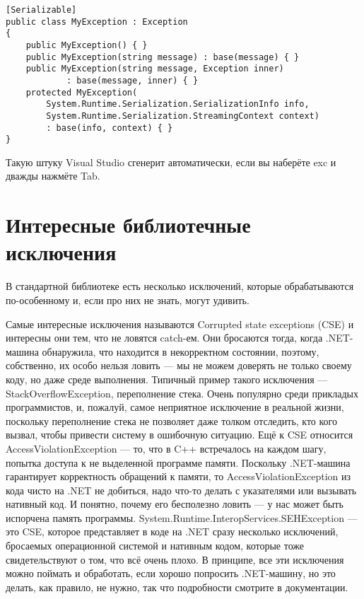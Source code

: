 \documentclass[a5paper]{article}
\begin{document}
\begin{verbatim}
[Serializable]
public class MyException : Exception
{
    public MyException() { }
    public MyException(string message) : base(message) { }
    public MyException(string message, Exception inner) 
            : base(message, inner) { }
    protected MyException(
        System.Runtime.Serialization.SerializationInfo info,
        System.Runtime.Serialization.StreamingContext context)
        : base(info, context) { }
}
\end{verbatim}

Такую штуку Visual Studio сгенерит автоматически, если вы наберёте exc и дважды нажмёте Tab.

\section{Интересные библиотечные исключения}

В стандартной библиотеке есть несколько исключений, которые обрабатываются по-особенному и, если про них не знать, могут удивить. 

Самые интересные исключения называются Corrupted state exceptions (CSE) и интересны они тем, что не ловятся catch-ем. Они бросаются тогда, когда .NET-машина обнаружила, что находится в некорректном состоянии, поэтому, собственно, их особо нельзя ловить --- мы не можем доверять не только своему коду, но даже среде выполнения. Типичный пример такого исключения --- StackOverflowException, переполнение стека. Очень популярно среди прикладых программистов, и, пожалуй, самое неприятное исключение в реальной жизни, поскольку переполнение стека не позволяет даже толком отследить, кто кого вызвал, чтобы привести систему в ошибочную ситуацию. Ещё к CSE относится AccessViolationException --- то, что в C++ встречалось на каждом шагу, попытка доступа к не выделенной программе памяти. Поскольку .NET-машина гарантирует корректность обращений к памяти, то AccessViolationException из кода чисто на .NET не добиться, надо что-то делать с указателями или вызывать нативный код. И понятно, почему его бесполезно ловить --- у нас может быть испорчена память программы. System.Runtime.InteropServices.SEHException --- это CSE, которое представляет в коде на .NET сразу несколько исключений, бросаемых операционной системой и нативным кодом, которые тоже свидетельствуют о том, что всё очень плохо. В принципе, все эти исключения можно поймать и обработать, если хорошо попросить .NET-машину, но это делать, как правило, не нужно, так что подробности смотрите в документации.
\end{document}
